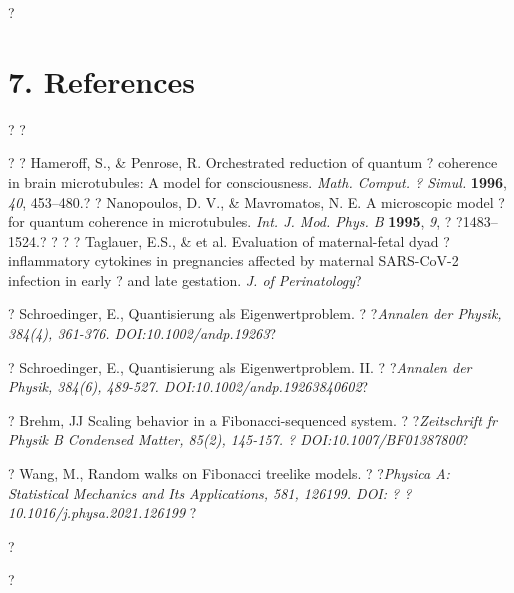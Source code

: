 ?\section*{7. References}?
?\begin{thebibliography}{999}?
? Hameroff, S., \& Penrose, R. Orchestrated reduction of quantum ?
coherence in brain microtubules: A model for consciousness. \textit{Math. Comput. ?
Simul.} \textbf{1996}, \textit{40}, 453--480.?
? Nanopoulos, D. V., \& Mavromatos, N. E. A microscopic model ?
for quantum coherence in microtubules. \textit{Int. J. Mod. Phys. B} \textbf{1995}, \textit{9}, ?
?1483--1524.?
?    ?
? Taglauer, E.S., \& et al. Evaluation of maternal-fetal dyad ?
inflammatory cytokines in pregnancies affected by maternal SARS-CoV-2  infection in early ?
and late gestation. \emph{J. of Perinatology}?

?  Schroedinger, E., Quantisierung als Eigenwertproblem. ?
?\emph{Annalen der Physik, 384(4), 361-376. DOI:10.1002/andp.19263}?

? Schroedinger, E., Quantisierung als Eigenwertproblem. II. ?
?\emph{Annalen der Physik, 384(6), 489-527. DOI:10.1002/andp.19263840602}?

? Brehm, JJ Scaling behavior in a Fibonacci-sequenced system. ?
?\emph{Zeitschrift fr Physik B Condensed Matter, 85(2), 145-157. ?
DOI:10.1007/BF01387800}?

?  Wang, M., Random walks on Fibonacci treelike models. ?
?\emph{Physica A: Statistical Mechanics and Its Applications, 581, 126199. DOI: ?
?10.1016/j.physa.2021.126199} ?

?\end{thebibliography}?

